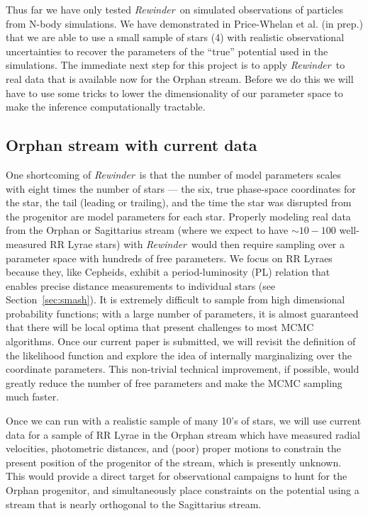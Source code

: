 \documentclass[letterpaper,12pt,preprint]{aastex}
\newcommand{\rewinder}{\emph{Rewinder}}
\begin{document}
Thus far we have only tested \rewinder\ on simulated observations of particles from N-body simulations. We have demonstrated in Price-Whelan et al. (in prep.) that we are able to use a small sample of stars (4) with realistic observational uncertainties to recover the parameters of the ``true'' potential used in the simulations. The immediate next step for this project is to apply \rewinder\ to real data that is available now for the Orphan stream. Before we do this we will have to use some tricks to lower the dimensionality of our parameter space to make the inference computationally tractable.

\subsection{Orphan stream with current data}

One shortcoming of \rewinder\ is that the number of model parameters scales with eight times the number of stars --- the six, true phase-space coordinates for the star, the tail (leading or trailing), and the time the star was disrupted from the progenitor are model parameters for each star. Properly modeling real data from the Orphan or Sagittarius stream (where we expect to have $\sim10-100$ well-measured RR Lyrae stars) with \rewinder\ would then require sampling over a parameter space with hundreds of free parameters. We focus on RR Lyraes because they, like Cepheids, exhibit a period-luminosity (PL) relation that enables precise distance measurements to individual stars (see Section~\ref{sec:smash}). It is extremely difficult to sample from high dimensional probability functions; with a large number of parameters, it is almost guaranteed that there will be local optima that present challenges to most MCMC algorithms. Once our current paper is submitted, we will revisit the definition of the likelihood function and explore the idea of internally marginalizing over the coordinate parameters. This non-trivial technical improvement, if possible, would greatly reduce the number of free parameters and make the MCMC sampling much faster. 

Once we can run with a realistic sample of many 10's of stars, we will use current data for a sample of RR Lyrae in the Orphan stream which have measured radial velocities, photometric distances, and (poor) proper motions to constrain the present position of the progenitor of the stream, which is presently unknown. This would provide a direct target for observational campaigns to hunt for the Orphan progenitor, and simultaneously place constraints on the potential using a stream that is nearly orthogonal to the Sagittarius stream.
\end{document}
